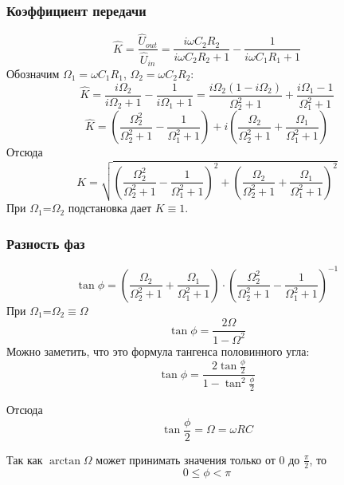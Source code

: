 \subsubsection{Коэффициент передачи}
\begin{equation}
	\hat{K}=\frac{\hat{U}_{out}}{\hat{U}_{in}}=
	\frac{i\omega C_2 R_2}{i\omega C_2 R_2+1}-
	\frac{1}{i\omega C_1 R_1+1}
\end{equation}
Обозначим $\Omega_1=\omega C_1R_1$, $\Omega_2=\omega C_2R_2$:
\begin{equation}
	\hat{K}=\frac{i\Omega_2}{i\Omega_2+1}-\frac{1}{i\Omega_1+1}=
	\frac{i\Omega_2(1-i\Omega_2)}{\Omega_2^2+1}+\frac{i\Omega_1-1}{\Omega_1^2+1}
\end{equation}
\begin{equation}
	\hat{K}=
	\left(
	\frac{\Omega_2^2}{\Omega_2^2+1}-
	\frac{1}{\Omega_1^2+1}
	\right)+
	i\left(
	\frac{\Omega_2}{\Omega_2^2+1}+
	\frac{\Omega_1}{\Omega_1^2+1}
	\right)
\end{equation}
Отсюда
\begin{equation}
	K=
	\sqrt{
		\left(
		\frac{\Omega_2^2}{\Omega_2^2+1}-
		\frac{1}{\Omega_1^2+1}
		\right)^2+
		\left(
		\frac{\Omega_2}{\Omega_2^2+1}+
		\frac{\Omega_1}{\Omega_1^2+1}
		\right)^2
	}
\end{equation}
При $\Omega_1$=$\Omega_2$ подстановка дает $K\equiv 1$.

\subsubsection{Разность фаз}
\begin{equation}
	\tan\phi=\left(
	\frac{\Omega_2}{\Omega_2^2+1}+
	\frac{\Omega_1}{\Omega_1^2+1}
	\right)
	\cdot
	\left(
	\frac{\Omega_2^2}{\Omega_2^2+1}-
	\frac{1}{\Omega_1^2+1}
	\right)^{-1}
\end{equation}
При $\Omega_1$=$\Omega_2 \equiv \Omega$
\begin{equation}
	\tan\phi=\frac{2\Omega}{1-\Omega^2}
\end{equation}
Можно заметить, что это формула тангенса половинного угла:
\begin{equation}
	\tan\phi=\frac{2\tan\frac{\phi}{2}}{1-\tan^2\frac{\phi}{2}}
\end{equation}

Отсюда
\begin{equation}
	\tan\frac{\phi}{2}=\Omega = \omega RC
\end{equation}

Так как $\arctan\Omega$ может принимать значения только от 0 до $\frac{\pi}2$, то
\begin{equation}
	0\leq\phi<\pi
\end{equation}

